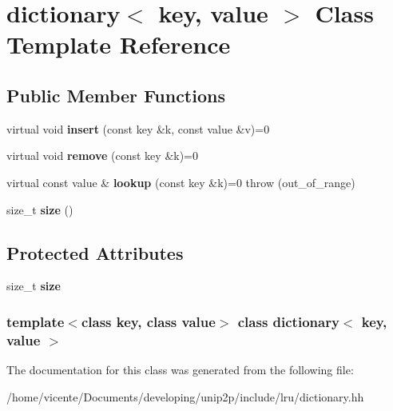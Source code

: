 \hypertarget{classdictionary}{\section{dictionary$<$ key, value $>$ \-Class \-Template \-Reference}
\label{classdictionary}
}
\subsection*{\-Public \-Member \-Functions}
\begin{DoxyCompactItemize}
\item 
\hypertarget{classdictionary_aff52b144d51c382c58c43b34d30da289}{virtual void {\bfseries insert} (const key \&k, const value \&v)=0}\label{classdictionary_aff52b144d51c382c58c43b34d30da289}

\item 
\hypertarget{classdictionary_a41f50be733b17a762c93ea5dcbfe3b9d}{virtual void {\bfseries remove} (const key \&k)=0}\label{classdictionary_a41f50be733b17a762c93ea5dcbfe3b9d}

\item 
\hypertarget{classdictionary_a8c89daafc0d9ffa1901f46f4e1c7787e}{virtual const value \& {\bfseries lookup} (const key \&k)=0  throw (out\-\_\-of\-\_\-range)}\label{classdictionary_a8c89daafc0d9ffa1901f46f4e1c7787e}

\item 
\hypertarget{classdictionary_adef06fb41f3ae08fa8f15bd475f7e388}{size\-\_\-t {\bfseries size} ()}\label{classdictionary_adef06fb41f3ae08fa8f15bd475f7e388}

\end{DoxyCompactItemize}
\subsection*{\-Protected \-Attributes}
\begin{DoxyCompactItemize}
\item 
\hypertarget{classdictionary_a234b6fdddfbc3c3b8f500764a02f8dd9}{size\-\_\-t {\bfseries size}}\label{classdictionary_a234b6fdddfbc3c3b8f500764a02f8dd9}

\end{DoxyCompactItemize}
\subsubsection*{template$<$class key, class value$>$ class dictionary$<$ key, value $>$}



\-The documentation for this class was generated from the following file\-:\begin{DoxyCompactItemize}
\item 
/home/vicente/\-Documents/developing/unip2p/include/lru/dictionary.\-hh\end{DoxyCompactItemize}
